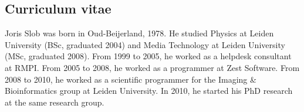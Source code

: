 \documentclass[11pt, a4paper]{Thesis} %
\begin{document}
\begin{titlepage}
\chapter{Curriculum vitae}
Joris Slob was born in Oud-Beijerland, 1978. He studied Physics at
Leiden University (BSc, graduated 2004) and Media Technology at Leiden
University (MSc, graduated 2008). From 1999 to 2005, he worked as a
helpdesk consultant at RMPI. From 2005 to 2008, he worked as a
programmer at Zest Software. From 2008 to 2010, he worked as a
scientific programmer for the Imaging \& Bioinformatics group at
Leiden University. In 2010, he started his PhD research at the same
research group.
\end{titlepage}
\end{document}
